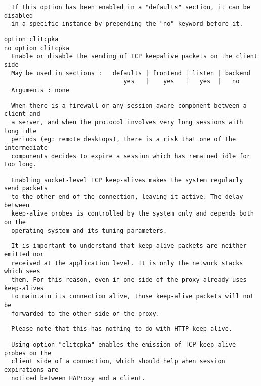 \begin{verbatim}
  If this option has been enabled in a "defaults" section, it can be disabled
  in a specific instance by prepending the "no" keyword before it.
\end{verbatim}

\begin{verbatim}
option clitcpka
no option clitcpka
  Enable or disable the sending of TCP keepalive packets on the client side
  May be used in sections :   defaults | frontend | listen | backend
                                 yes   |    yes   |   yes  |   no
  Arguments : none
\end{verbatim}

\begin{verbatim}
  When there is a firewall or any session-aware component between a client and
  a server, and when the protocol involves very long sessions with long idle
  periods (eg: remote desktops), there is a risk that one of the intermediate
  components decides to expire a session which has remained idle for too long.
\end{verbatim}

\begin{verbatim}
  Enabling socket-level TCP keep-alives makes the system regularly send packets
  to the other end of the connection, leaving it active. The delay between
  keep-alive probes is controlled by the system only and depends both on the
  operating system and its tuning parameters.
\end{verbatim}

\begin{verbatim}
  It is important to understand that keep-alive packets are neither emitted nor
  received at the application level. It is only the network stacks which sees
  them. For this reason, even if one side of the proxy already uses keep-alives
  to maintain its connection alive, those keep-alive packets will not be
  forwarded to the other side of the proxy.
\end{verbatim}

\begin{verbatim}
  Please note that this has nothing to do with HTTP keep-alive.
\end{verbatim}

\begin{verbatim}
  Using option "clitcpka" enables the emission of TCP keep-alive probes on the
  client side of a connection, which should help when session expirations are
  noticed between HAProxy and a client.
\end{verbatim}

